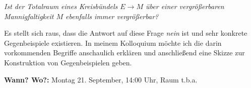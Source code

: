 \documentclass[12pt,a4paper]{article}
\begin{document}
\begin{center}
\begin{minipage}{0.8\textwidth}
    \centering \itshape
    Ist der Totalraum eines Kreisbündels $E \to M$ über einer vergrößerbaren Mannigfaltigkeit $M$ ebenfalls immer vergrößerbar?
\end{minipage}
\end{center}

\vspace{0.15cm}

Es stellt sich raus, dass die Antwort auf diese Frage \textit{nein} ist und sehr konkrete Gegenbeispiele existieren. In meinem Kolloquium möchte ich die darin vorkommenden Begriffe anschaulich erklären und anschließend eine Skizze zur Konstruktion von Gegenbeispielen geben.

\vfill

\textbf{Wann? Wo?:} Montag 21. September, 14:00 Uhr, Raum t.b.a.
\end{document}
